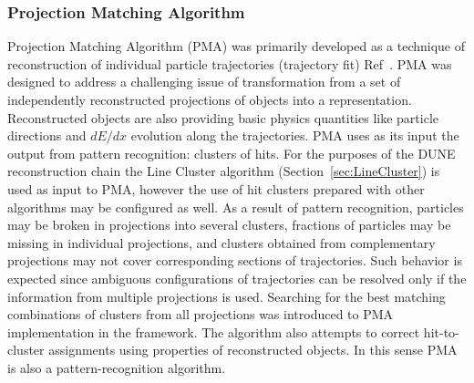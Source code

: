 \subsubsection{Projection Matching Algorithm}\label{sec:PMA}
Projection Matching Algorithm (PMA)  was primarily developed as a technique of \threed reconstruction of individual particle trajectories (trajectory fit) Ref~\cite{Antonello:2012hu}. PMA was designed to address a challenging issue of transformation from a set of independently reconstructed \twod projections of objects into a \threed representation. Reconstructed \threed objects are also providing  basic physics quantities like particle directions and $dE/dx$ evolution along the trajectories. PMA uses as its input the output from \twod pattern recognition: clusters of hits. For the purposes of the DUNE reconstruction chain the Line Cluster algorithm (Section~\ref{sec:LineCluster}) is used as input to PMA, however the use of hit clusters prepared with other algorithms may be configured as well. As a result of \twod pattern recognition, particles may be broken in \twod projections into several clusters, 
  fractions of particles may be missing in individual projections, and clusters obtained from complementary projections %
may not cover corresponding sections of trajectories. Such behavior is expected since ambiguous configurations of trajectories can be resolved only if the information from multiple \twod projections is used. Searching for the best matching combinations of clusters from all \twod projections was introduced to PMA implementation in the  framework. The algorithm also attempts to correct hit-to-cluster assignments using properties of \threed reconstructed objects. In this sense PMA is also a pattern-recognition algorithm.

